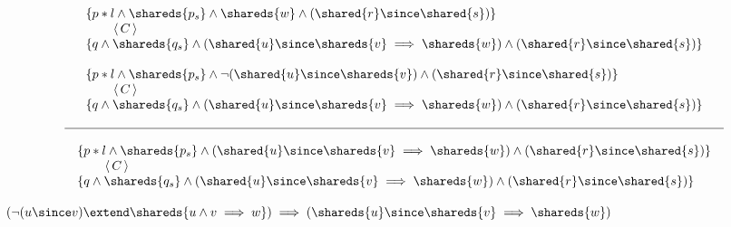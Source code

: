 \[
\begin{array}{c}
\begin{array}{l}
\{p*l \land \shareds{p_s} 
\land 
\shareds{w} 
\land (\shared{r} \since \shared{s}) \}
\\
\qquad \,\langle\, C \,\rangle\,
\\
\{q \land \shareds{q_s} 
\land 
(\shared{u} \since \shareds{v} \implies \shareds{w}) 
\land (\shared{r} \since \shared{s}) \}
\end{array}
\\
\\
\begin{array}{l}
\{p*l \land \shareds{p_s} 
\land 
\neg (\shared{u} \since \shareds{v}) 
\land (\shared{r} \since \shared{s}) \}
\\
\qquad \,\langle\, C \,\rangle\,
\\
\{q \land \shareds{q_s} 
\land 
(\shared{u} \since \shareds{v} \implies \shareds{w}) 
\land (\shared{r} \since \shared{s}) \}
\end{array}
\\
\\
\hline
\\
  \begin{array}{l}
  \{p*l \land \shareds{p_s} 
  \land 
  (\shared{u} \since \shareds{v} \implies \shareds{w}) 
  \land (\shared{r} \since \shared{s}) \}
  \\
  \qquad \,\langle\, C \,\rangle\,
  \\
  \{q \land \shareds{q_s} 
  \land 
  (\shared{u} \since \shareds{v} \implies \shareds{w}) 
  \land (\shared{r} \since \shared{s}) \}
  \end{array}
\end{array}
\]

$
(\neg (u \since v)
\extend
\shareds{u \land v \implies w})
\implies
(\shareds{u} \since \shareds{v} \implies \shareds{w})
$

